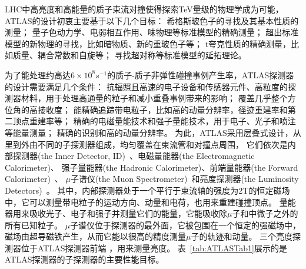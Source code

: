 LHC中高亮度和高能量的质子束流对撞使得探索TeV量级的物理学成为可能，\textsc{ATLAS}的设计初衷主要基于以下几个目标：
希格斯玻色子的寻找及其基本性质的测量；
量子色动力学、电弱相互作用、味物理等标准模型的精确测量；
超出标准模型的新物理的寻找，比如暗物质、新的重玻色子等；
t夸克性质的精确测量，比如质量、耦合常数和自旋等；
寻找超对称等标准模型的延拓理论。

为了能处理约高达$6\times10^8s^{-1}$的质子-质子非弹性碰撞事例产生率，\textsc{ATLAS}探测器的设计需要满足几个条件：
抗辐照且高速的电子设备和传感器元件、高粒度的探测器材料，用于处理高通量的粒子和减小重叠事例带来的影响；
覆盖几乎整个方位角的高接收度；
能精确追踪带电粒子，比如高的动量分辨率，径迹重建率和第二顶点重建率等；
精确的电磁量能技术和强子量能技术，用于电子、光子和喷注等能量测量；
精确的识别和高的动量分辨率。
为此，\textsc{ATLAS}采用层叠式设计，从里到外由不同的子探测器组成，均匀覆盖在束流管和对撞点周围，
它们依次是内部探测器(the Inner Detector, ID)~\cite{ATLASINNER}、电磁量能器(the Electromagnetic Calorimeter)、
强子量能器(the Hadronic Calorimeter)、前端量能器(the Forward Calorimeter)~\cite{ATLASLACA,ATLASTCA}、
$\mu$子谱仪(the Muon Spectrometer)~\cite{ATLASMUSPEC}和亮度探测器(the Luminosity Detectors)~\cite{ATLASLUMID}。
其中，内部探测器处于一个平行于束流轴的强度为2T的恒定磁场中，它可以测量带电粒子的运动方向、动量和电荷，也用来重建碰撞顶点。
量能器用来吸收光子、电子和强子并测量它们的能量，它能吸收除$\mu$子和中微子之外的所有已知粒子。
$\mu$子谱仪位于探测器的最外面，它被包围在一个恒定的强磁场中，磁场由超导磁铁产生，从而它能以很高的精度测量$\mu$子的轨迹和动量。
三个亮度探测器位于\textsc{ATLAS}探测器前端
，用来测量亮度。
表~\ref{tab:ATLASTab1}展示的是\textsc{ATLAS}探测器的子探测器的主要性能目标。

